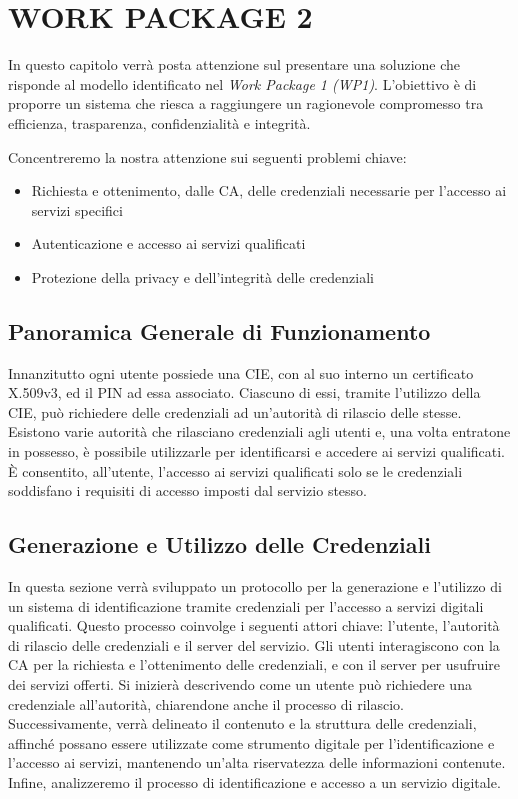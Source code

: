 \chapter{WORK PACKAGE 2}
    In questo capitolo verrà posta attenzione sul presentare una soluzione che risponde al modello identificato nel \textit{Work Package 1 (WP1)}.
    L’obiettivo è di proporre un sistema che riesca a raggiungere un ragionevole compromesso tra efficienza, trasparenza, confidenzialità e integrità.

    \noindent Concentreremo la nostra attenzione sui seguenti problemi chiave:
    
    \begin{itemize}        
        \item Richiesta e ottenimento, dalle CA, delle credenziali necessarie per l'accesso ai servizi specifici
        
        \item Autenticazione e accesso ai servizi qualificati
    
        \item Protezione della privacy e dell'integrità delle credenziali
    \end{itemize}


    \section{Panoramica Generale di Funzionamento}
        Innanzitutto ogni utente possiede una CIE, con al suo interno un certificato X.509v3, ed il PIN ad essa associato.
        Ciascuno di essi, tramite l'utilizzo della CIE, può richiedere delle credenziali ad un'autorità di rilascio delle stesse.
        Esistono varie autorità che rilasciano credenziali agli utenti e, una volta entratone in possesso, è possibile utilizzarle per identificarsi e accedere ai servizi qualificati.
        È consentito, all’utente, l'accesso ai servizi qualificati solo se le credenziali soddisfano i requisiti di accesso imposti dal servizio stesso.


    \section{Generazione e Utilizzo delle Credenziali}
        In questa sezione verrà sviluppato un protocollo per la generazione e l'utilizzo di un sistema di identificazione tramite credenziali per l'accesso a servizi digitali qualificati.
        Questo processo coinvolge i seguenti attori chiave: l'utente, l'autorità di rilascio delle credenziali e il server del servizio.
        Gli utenti interagiscono con la CA per la richiesta e l'ottenimento delle credenziali, e con il server per usufruire dei servizi offerti.
        Si inizierà descrivendo come un utente può richiedere una credenziale all'autorità, chiarendone anche il processo di rilascio.
        Successivamente, verrà delineato il contenuto e la struttura delle credenziali, affinché possano essere utilizzate come strumento digitale per l'identificazione e l'accesso ai servizi, mantenendo un'alta riservatezza delle informazioni contenute.
        Infine, analizzeremo il processo di identificazione e accesso a un servizio digitale.
                
